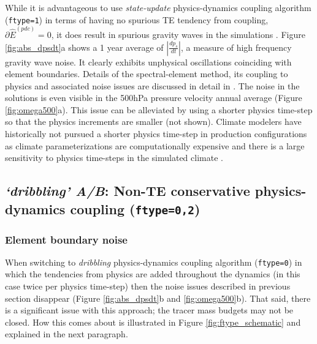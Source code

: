 \documentclass{agujournal}
\newcommand*{\gi}[1]{\widehat{#1}}
\begin{document}
While it is advantageous to use {\em{state-update}} physics-dynamics coupling algorithm ({\tt{ftype=1}}) in terms of having no spurious TE tendency from coupling, $\partial \gi{E}^{({pdc})}=0$, it does result in spurious gravity waves in the simulations \cite[see, e.g., Figure 5 in ][]{GetAl2018MWR}. Figure \ref{fig:abs_dpsdt}a shows a 1 year average of $|\frac{dp_s}{dt}|$, a measure of high frequency gravity wave noise. It clearly exhibits unphysical oscillations coinciding with element boundaries. Details of the spectral-element method, its coupling to physics and associated noise issues are discussed in detail in \citet{HetAl2018MWR}. The noise in the solutions is even visible in the 500hPa pressure velocity annual average (Figure \ref{fig:omega500}a). This issue can be alleviated by using a shorter physics time-step so that the physics increments are smaller (not shown). Climate modelers have historically not pursued a shorter physics time-step in production configurations as climate parameterizations are computationally expensive and there is a large sensitivity to physics time-steps in the simulated climate \citep[e.g.][]{WO2003QJR,WetAl2015JAMES}.

\subsection{{\em{`dribbling' A/B}}: Non-TE conservative physics-dynamics coupling ({\tt{ftype=0,2}})}\label{se:pdc_problem}
\subsubsection{Element boundary noise}\label{sec:noise}
When switching to {\em{dribbling}} physics-dynamics coupling algorithm ({\tt{ftype=0}}) in which the tendencies from physics are added throughout the dynamics (in this case twice per physics time-step) then the noise issues described in previous section disappear (Figure \ref{fig:abs_dpsdt}b and \ref{fig:omega500}b). That said, there is a significant issue with this approach; the tracer mass budgets may not be closed. How this comes about is illustrated in Figure \ref{fig:ftype_schematic} and explained in the next paragraph. 
\end{document}
